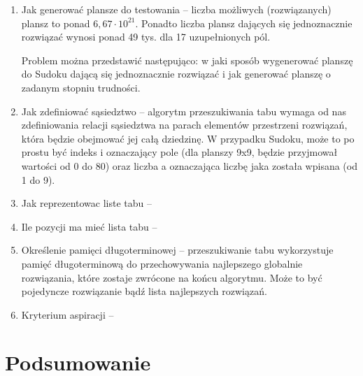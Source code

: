 \documentclass[]{project_report}
\begin{document}
	\begin{enumerate}
		\item Jak generować plansze do testowania -- liczba możliwych (rozwiązanych) plansz to ponad \(6,67 \cdot 10^{21}\)\cite{OEIS}. Ponadto liczba plansz dających się jednoznacznie rozwiązać wynosi ponad 49 tys. dla 17 uzupełnionych pól.
		
		Problem można przedstawić następująco: w jaki sposób wygenerować planszę do Sudoku dającą się jednoznacznie rozwiązać i jak generować planszę o zadanym stopniu trudności.
		
		\item Jak zdefiniować sąsiedztwo -- algorytm przeszukiwania tabu wymaga od nas zdefiniowania relacji sąsiedztwa na parach elementów przestrzeni rozwiązań, która będzie obejmować jej całą dziedzinę. W przypadku Sudoku, może to po  prostu być indeks i oznaczający pole (dla planszy 9x9, będzie przyjmował wartości od 0 do 80) oraz liczba a oznaczająca liczbę jaka została wpisana (od 1 do 9).
		
		\item Jak reprezentowac liste tabu --
		
		\item Ile pozycji ma mieć lista tabu --
		
		\item Określenie pamięci długoterminowej -- przeszukiwanie tabu wykorzystuje pamięć długoterminową do przechowywania najlepszego globalnie rozwiązania, które zostaje zwrócone na końcu algorytmu. Może to być pojedyncze rozwiązanie bądź lista najlepszych rozwiązań.
		
		\item Kryterium aspiracji --
		
		
	\end{enumerate}
	
	\section{Podsumowanie}
	
	
	\printbibliography
\end{document}
